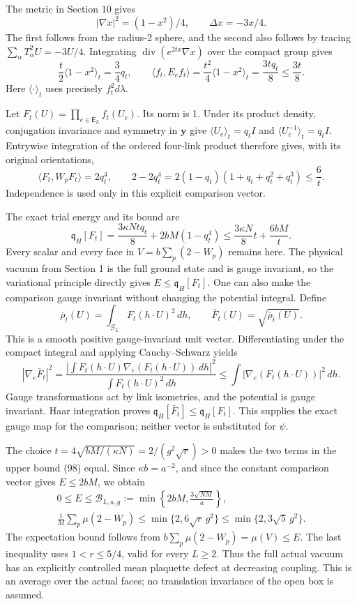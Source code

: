 \documentclass[
  11pt,
]{article}
\begin{document}
The metric in Section 10 gives \[
 |\nabla x|^2=(1-x^2)/4,\qquad \Delta x=-3x/4 .
\] The first follows from the radius-2 sphere, and the second also
follows by tracing \(\sum_\alpha T_\alpha^2U=-3U/4\). Integrating
\(\operatorname{div}(e^{2tx}\nabla x)\) over the compact group gives \[
 \frac{t}{2}\langle1-x^2\rangle_t=\frac34q_t,\qquad
 \langle f_t,E_e f_t\rangle=\frac{t^2}{4}\langle1-x^2\rangle_t
 =\frac{3tq_t}{8}\le\frac{3t}{8}.
 \tag{96}
\] Here \(\langle\cdot\rangle_t\) uses precisely \(f_t^2d\lambda\).

Let \(F_t(U)=\prod_{e\in\mathsf E_L}f_t(U_e)\). Its norm is 1. Under its
product density, conjugation invariance and symmetry in \(\mathbf y\)
give \(\langle U_e\rangle_t=q_t I\) and
\(\langle U_e^{-1}\rangle_t=q_t I\). Entrywise integration of the
ordered four-link product therefore gives, with its original
orientations, \[
 \langle F_t,W_pF_t\rangle=2q_t^4,\qquad
 2-2q_t^4=2(1-q_t)(1+q_t+q_t^2+q_t^3)\le\frac6t .
 \tag{97}
\] Independence is used only in this explicit comparison vector.

The exact trial energy and its bound are \[
 \mathfrak q_H[F_t]
 =\frac{3\kappa Ntq_t}{8}+2bM(1-q_t^4)
 \le\frac{3\kappa N}{8}t+\frac{6bM}{t}.
 \tag{98}
\] Every scalar and every face in \(V=b\sum_p(2-W_p)\) remains here. The
physical vacuum from Section 1 is the full ground state and is gauge
invariant, so the variational principle directly gives
\(E\le\mathfrak q_H[F_t]\). One can also make the comparison gauge
invariant without changing the potential integral. Define \[
 \bar\rho_t(U)=\int_{\mathcal G_L}F_t(h\cdot U)^2\,dh,\qquad
 \bar F_t(U)=\sqrt{\bar\rho_t(U)}.
\] This is a smooth positive gauge-invariant unit vector.
Differentiating under the compact integral and applying Cauchy--Schwarz
yields \[
 |\nabla_e\bar F_t|^2
 =\frac{|\int F_t(h\cdot U)\nabla_e(F_t(h\cdot U))\,dh|^2}
       {\int F_t(h\cdot U)^2\,dh}
 \le\int|\nabla_e(F_t(h\cdot U))|^2\,dh.
\] Gauge transformations act by link isometries, and the potential is
gauge invariant. Haar integration proves
\(\mathfrak q_H[\bar F_t]\le\mathfrak q_H[F_t]\). This supplies the
exact gauge map for the comparison; neither vector is substituted for
\(\psi\).

The choice \(t=4\sqrt{bM/(\kappa N)}=2/(g^2\sqrt r)>0\) makes the two
terms in the upper bound (98) equal. Since \(\kappa b=a^{-2}\), and
since the constant comparison vector gives \(E\le2bM\), we obtain \[
 \begin{gathered}
 0\le E\le\mathcal B_{L,a,g}
 :=\min\left\{2bM,\frac{3\sqrt{NM}}{a}\right\},
 \\
 \frac1M\sum_p\mu(2-W_p)
 \le\min\{2,6\sqrt r\,g^2\}
 \le\min\{2,3\sqrt5\,g^2\}.
 \end{gathered}
 \tag{99}
\] The expectation bound follows from \(b\sum_p\mu(2-W_p)=\mu(V)\le E\).
The last inequality uses \(1<r\le5/4\), valid for every \(L\ge2\). Thus
the full actual vacuum has an explicitly controlled mean plaquette
defect at decreasing coupling. This is an average over the actual faces;
no translation invariance of the open box is assumed.
\end{document}
